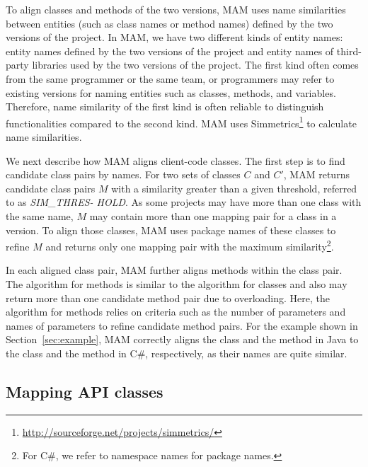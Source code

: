 To align classes and methods of the two versions, MAM uses
name similarities between entities (such as class names or method
names) defined by the two versions of the project. In MAM,
we have two different kinds of entity names: entity names defined by
the two versions of the project and entity names of third-party
libraries used by the two versions of the project. The first kind
often comes from the same programmer or the same team, or
programmers may refer to existing versions for naming entities such
as classes, methods, and variables. Therefore, name similarity of
the first kind is often reliable to distinguish functionalities
compared to the second kind. MAM uses
Simmetrics\footnote{\url{http://sourceforge.net/projects/simmetrics/}}
to calculate name similarities.

We next describe how MAM aligns client-code classes.
The first step is to find candidate class pairs by names. For two sets
of classes $C$ and $C'$, MAM returns candidate class
pairs $M$ with a similarity greater than a given threshold,
referred to as \emph{SIM\_THRES- HOLD}. As some projects may have more
than one class with the same name, $M$ may contain more than one
mapping pair for a class in a version. To align those classes, MAM uses package names of these classes to refine $M$ and
returns only one mapping pair with the maximum
similarity\footnote{For C\#, we refer to namespace names for package
names.}.

In each aligned class pair, MAM further aligns methods
within the class pair. The algorithm for methods is similar to the
algorithm for classes and also may return more than one candidate
method pair due to overloading. Here, the algorithm for methods
relies on criteria such as the number of parameters and names of
parameters to refine candidate method pairs. For the example shown
in Section~\ref{sec:example}, MAM correctly aligns the
class  and the method  in Java to
the class  and the method  in C\#,
respectively, as their names are quite similar.
\subsection{Mapping API classes}
\label{sec:approach:mappingtypes}


